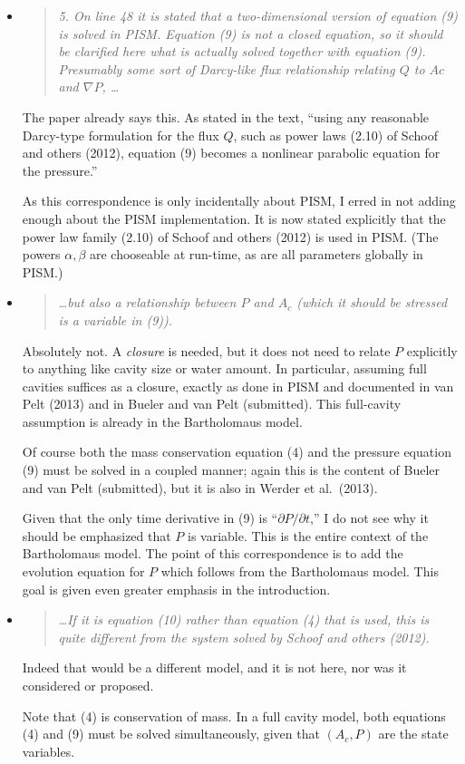\documentclass[11pt,reqno]{amsart}
\newcommand{\reply}[2]{
\medskip\medskip
\item  \begin{quote}
\emph{#1}
\end{quote}

\medskip
\noindent #2}
\begin{document}
\begin{itemize}
\reply{5. On line 48 it is stated that a two-dimensional version of equation (9) is solved in PISM.  Equation (9) is not a closed equation, so it should be clarified here what is actually solved  together with equation (9).  Presumably some sort of Darcy-like flux relationship relating $Q$ to $A c$ and $\nabla P$, \dots}
{The paper already says this.  As stated in the text, ``using any reasonable Darcy-type formulation for the flux $Q$, such as power laws (2.10) of Schoof and others (2012), equation (9) becomes a nonlinear parabolic equation for the pressure.''

As this correspondence is only incidentally about PISM, I erred in not adding enough about the PISM implementation.  It is now stated explicitly that the power law family (2.10) of Schoof and others (2012) is used in PISM.  (The powers $\alpha,\beta$ are chooseable at run-time, as are all parameters globally in PISM.)}

\reply{\dots but also a relationship between $P$ and $A_c$ (which it should be stressed is a variable in (9)).}
{Absolutely not.  A \emph{closure} is needed, but it does not need to relate $P$ explicitly to anything like cavity size or water amount.  In particular, assuming full cavities suffices as a closure, exactly as done in PISM and documented in van Pelt (2013) and in Bueler and van Pelt (submitted).  This full-cavity assumption is already in the Bartholomaus model.

Of course both the mass conservation equation (4) and the pressure equation (9) must be solved in a coupled manner; again this is the content of Bueler and van Pelt (submitted), but it is also in Werder et al.~(2013).

Given that the only time derivative in (9) is ``$\partial P/\partial t$,'' I do not see why it should be emphasized that $P$ is variable.  This is the entire context of the Bartholomaus model.  The point of this correspondence is to add the evolution equation for $P$ which follows from the Bartholomaus model.  This goal is given even greater emphasis in the introduction.}

\reply{\dots  If it is equation (10) rather than equation (4) that is used, this is quite different from the system solved by Schoof and others (2012).}
{Indeed that would be a different model, and it is not here, nor was it considered or proposed.

Note that (4) is conservation of mass.  In a full cavity model, both equations (4) and (9) must be solved simultaneously, given that $(A_c,P)$ are the state variables.

}
\end{itemize}
\end{document}
